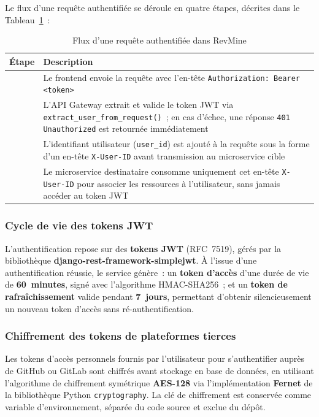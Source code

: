Le flux d'une requête authentifiée se déroule en quatre étapes, décrites dans le
Tableau~\ref{tab:flux-auth}~:

\begin{table}[H]
\centering
\small
\caption{Flux d'une requête authentifiée dans RevMine}
\label{tab:flux-auth}
\begin{tabular}{|>{\centering\arraybackslash}p{0.8cm}
                |>{\raggedright\arraybackslash}p{12.5cm}|}
\hline
\textbf{Étape} & \textbf{Description} \\
\hline
1 & Le frontend envoie la requête avec l'en-tête \texttt{Authorization: Bearer <token>} \\
\hline
2 & L'API Gateway extrait et valide le token JWT via \texttt{extract\_user\_from\_request()}~;
    en cas d'échec, une réponse \texttt{401 Unauthorized} est retournée immédiatement \\
\hline
3 & L'identifiant utilisateur (\texttt{user\_id}) est ajouté à la requête sous la forme
    d'un en-tête \texttt{X-User-ID} avant transmission au microservice cible \\
\hline
4 & Le microservice destinataire consomme uniquement cet en-tête \texttt{X-User-ID} pour
    associer les ressources à l'utilisateur, sans jamais accéder au token JWT \\
\hline
\end{tabular}
\end{table}

\subsubsection{Cycle de vie des tokens JWT}

L'authentification repose sur des \textbf{tokens JWT} (RFC~7519), gérés par la bibliothèque
\textbf{django-rest-framework-simplejwt}. À l'issue d'une authentification réussie, le service
génère~: un \textbf{token d'accès} d'une durée de vie de \textbf{60~minutes}, signé avec
l'algorithme HMAC-SHA256~; et un \textbf{token de rafraîchissement} valide pendant
\textbf{7~jours}, permettant d'obtenir silencieusement un nouveau token d'accès sans
ré-authentification.

\subsubsection{Chiffrement des tokens de plateformes tierces}

Les tokens d'accès personnels fournis par l'utilisateur pour s'authentifier auprès de GitHub ou
GitLab sont chiffrés avant stockage en base de données, en utilisant l'algorithme de chiffrement
symétrique \textbf{AES-128} via l'implémentation \textbf{Fernet} de la bibliothèque Python
\texttt{cryptography}. La clé de chiffrement est conservée comme variable d'environnement,
séparée du code source et exclue du dépôt.

